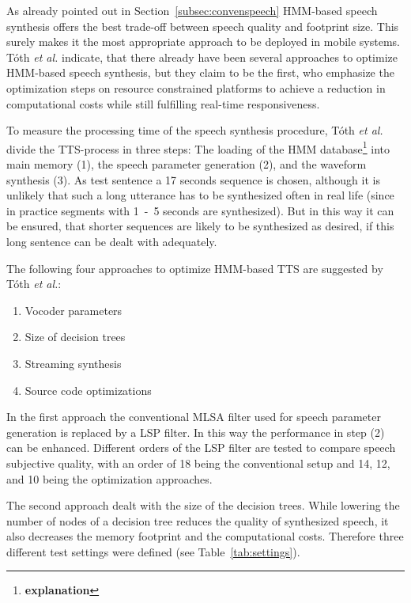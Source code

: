 As already pointed out in Section~\ref{subsec:convenspeech} \ac{HMM}-based speech synthesis offers the best trade-off between speech quality and footprint size. This surely makes it the most appropriate approach to be deployed in mobile systems. T\'oth \textit{et al.} indicate, that there already have been several approaches to optimize \ac{HMM}-based speech synthesis, but they claim to be the first, who emphasize the optimization steps on resource constrained platforms to achieve a reduction in computational costs while still fulfilling real-time responsiveness.

To measure the processing time of the speech synthesis procedure, T\'oth \textit{et al.} divide the \ac{TTS}-process in three steps: The loading of the \ac{HMM} database\footnote{\textbf{\color{ACMRed}explanation}} into main memory (1), the speech parameter generation (2), and the waveform synthesis (3). As test sentence a 17 seconds sequence is chosen, although it is unlikely that such a long utterance has to be synthesized often in real life (since in practice segments with 1~-~5 seconds are synthesized). But in this way it can be ensured, that shorter sequences are likely to be synthesized as desired, if this long sentence can be dealt with adequately.

The following four approaches to optimize \ac{HMM}-based \ac{TTS} are suggested by T\'oth \textit{et al.}:

\begin{enumerate}[label=\arabic*.]		%
	\parskip0.25em
	\bfseries
	\item Vocoder parameters
	\item Size of decision trees
	\item Streaming synthesis
	\item Source code optimizations
\end{enumerate}

In the first approach the conventional \ac{MLSA} filter used for speech parameter generation is replaced by a \ac{LSP} filter. In this way the performance in step (2) can be enhanced. Different orders of the \ac{LSP} filter are tested to compare speech subjective quality, with an order of 18 being the conventional setup and 14, 12, and 10 being the optimization approaches.

The second approach dealt with the size of the decision trees. While lowering the number of nodes of a decision tree reduces the quality of synthesized speech, it also decreases the memory footprint and the computational costs. Therefore three different test settings were defined (see Table~\ref{tab:settings}).

